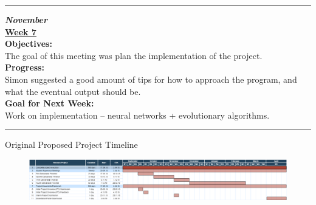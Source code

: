 \documentclass[12pt,a4paper]{article}
\makeatletter
\renewcommand\section{\@startsection {section}{1}{0mm}
                               {4pt plus 2pt minus 1pt}
                               {4pt plus 0pt}
                               {\bfseries}}
\makeatother
\begin{document}
\begin{appendices}
\hrule

\textbf{\textit{November}} \\
\newline
\textbf{\underline{Week 7}} \\
\newline
\textbf{Objectives:} \\
The goal of this meeting was plan the implementation of the project. \\

\textbf{Progress:} \\
Simon suggested a good amount of tips for how to approach the program, and what the eventual output should be.   \\

\textbf{Goal for Next Week:} \\
Work on implementation – neural networks + evolutionary algorithms. \\

\hrule

\newpage
\section{Original Proposed Project Timeline}

\begin{figure}[H]
	\centering
		\includegraphics[width=1.5\textwidth,height=\textheight,keepaspectratio, angle=90,origin=c]{HonoursTimeline}
\end{figure}

\end{appendices}
\end{document}
